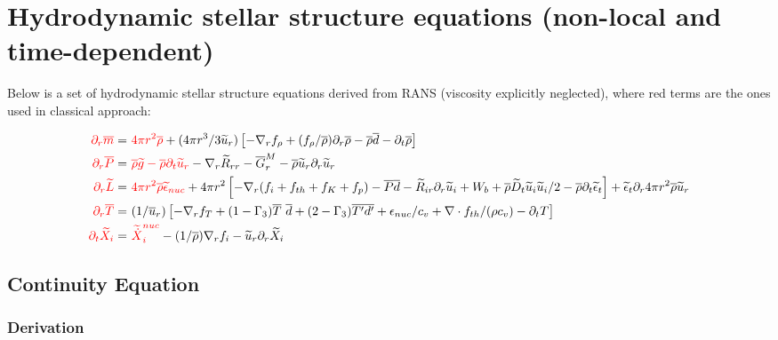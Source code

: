 \documentclass[10pt,paper=a4]{report}
\newcommand{\eht}{\overline}
\newcommand{\fht}{\widetilde}
\begin{document}
%


\newpage

\section{Hydrodynamic stellar structure equations (non-local and time-dependent)}

Below is a set of hydrodynamic stellar structure equations derived from RANS (viscosity explicitly neglected), where red terms are the ones used in classical approach:

\begin{align}
 {\color{red} \partial_r \eht{m}} = & \ {\color{red} 4\pi r^2 \eht{\rho}} + (4 \pi r^3 / 3 \fht{u}_r) \left[-\nabla_r f_\rho + (f_\rho / \eht{\rho})\partial_r \eht{\rho} - \eht{\rho}\eht{d} - \partial_t \eht{\rho}   \right]  \\
 {\color{red} \partial_r \eht{P}} = & {\color{red}\ \eht{\rho}\fht{g} - \eht{\rho}\partial_t \fht{u}_r} - \nabla_r \fht{R}_{rr} - \eht{G}_r^M - \eht{\rho}\fht{u}_r \partial_r \fht{u}_r   \\
{\color{red}\partial_r \fht{L}} = & \ {\color{red} 4\pi r^2 \eht{\rho} \fht{\epsilon}_{nuc}}  + 4\pi r^2 \left[-\nabla_r (f_i + f_{th}+f_K + f_p) - \eht{P}\eht{d} - \fht{R}_{ir}\partial_r \fht{u}_i + W_b + \eht{\rho}\fht{D}_t \fht{u}_i \fht{u}_i /2 - \eht{\rho} \partial_t \fht{\epsilon}_t \right] + \fht{\epsilon}_t \partial_r 4 \pi r^2 \eht{\rho}\fht{u}_r  \\
{\color{red} \partial_r \eht{T}} = & \ (1/\eht{u}_r) \left[ -\nabla_r f_T + (1-\Gamma_3)\eht{T} \ \eht{d} + (2-\Gamma_3)\eht{T'd'} + \epsilon_{nuc} / c_v + \nabla \cdot f_{th} / (\rho c_v) - \partial_t T \right]  \\
{\color{red}\partial_t \fht{X}_i} = & \ {\color{red}\fht{\dot{X}}_i^{nuc}} - (1/\eht{\rho})\nabla_r f_i - \fht{u}_r \partial_r \fht{X}_i 
\end{align}

\subsection{Continuity Equation}

\subsubsection{Derivation}
\end{document}
